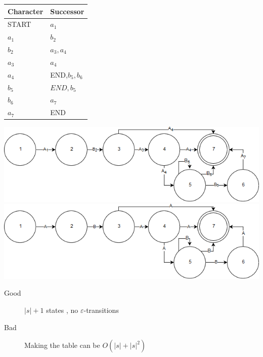 \begin{table}[H]
\centering
\begin{tabular}{|l|l|}
\hline
Character & Successor \\ \hline
START & $a_1$ \\ \hline
$a_1$ & $b_2$ \\ \hline
$b_2$ & $a_3, a_4$ \\ \hline
$a_3$ & $a_4$ \\ \hline
$a_4$ & END,$ b_5, b_6$ \\ \hline
$b_5$ & $END,b_5$ \\ \hline
$b_6$ & $a_7$ \\ \hline
$a_7$ & END \\ \hline
\end{tabular}
\label{tab:Regex2.23}
\end{table}
\includegraphics[width=\textwidth]{Regex/Regex24.png}
\includegraphics[width=\textwidth]{Regex/Regex25.png}
\begin{description}
    \item[Good] $|s|+1$ states , no $\varepsilon$-transitions
    \item[Bad] Making the table can be $O(|s| + |s|^2)$
\end{description}